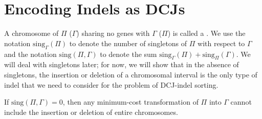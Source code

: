 \section{Encoding Indels as DCJs}
A chromosome of $\Pi$ ($\Gamma$) sharing no genes with $\Gamma$ ($\Pi$) is called a .  We use the notation $\mathrm{sing}_{\Gamma}(\Pi)$ to denote the number of singletons of $\Pi$ with respect to $\Gamma$ and the notation $\mathrm{sing}(\Pi, \Gamma)$ to denote the sum $\mathrm{sing}_{\Gamma}(\Pi) + \mathrm{sing}_{\Pi}(\Gamma)$.  We will deal with singletons later; for now, we will show that in the absence of singletons, the insertion or deletion of a chromosomal interval is the only type of indel that we need to consider for the problem of DCJ-indel sorting.

\begin{theorem}
If $\mathrm{sing}(\Pi, \Gamma) = 0$, then any minimum-cost transformation of $\Pi$ into $\Gamma$ cannot include the insertion or deletion of entire chromosomes.
\label{theorem:chromosome_indels}
\end{theorem}

